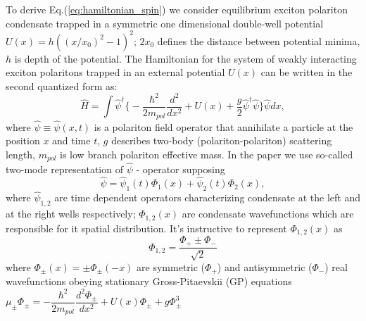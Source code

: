 \documentclass[aps, pre, preprint, groupedaddress, superscriptaddress, showkeys, showpacs] {revtex4-1}
\begin{document}
{To derive Eq.(\ref{eq:hamiltonian_spin}) we consider equilibrium exciton polariton condensate trapped in a symmetric one dimensional double-well potential $U(x) = h ((x/x_0)^2 - 1)^2$; $2x_0$ defines the distance between potential minima, $h$ is depth of the potential.
% 
%
The Hamiltonian for the system of weakly interacting exciton polaritons trapped in an external potential $U(x)$ can be written in the second quantized form as:
%
\begin{equation}
\hat{H} = \int \hat{\psi}^\dag\Big\{ -\dfrac{\hbar^2}{2m_{pol}}  \dfrac{d^2 }{dx^2} + U(x) + \dfrac{g}{2} \hat{\psi}^{\dag} \hat{\psi}  \Big\}\hat{\psi} dx,
\label{eq:gpe_hamiltonian}
\end{equation}
%
where $\hat{\psi} \equiv \hat{\psi}(x, t)$ is a polariton field operator that annihilate a particle at the position $x$ and time $t$, $g$ describes two-body (polariton-polariton) scattering length, $m_{pol}$ is low branch polariton effective mass.
In the paper we use so-called two-mode representation of $\hat{\psi}$ - operator supposing
%
\begin{equation}
\hat{\psi} = \hat{\psi}_1(t) \Phi_1(x) + \hat{\psi}_2(t) \Phi_2(x),
\label{eq:two_modes}
\end{equation}
%
where $\hat{\psi}_{1,2}$ are time dependent operators characterizing condensate at the left and at the right wells respectively; $\Phi_{1,2}(x)$ are condensate wavefunctions which are responsible for it spatial distribution.
It's instructive to represent  $\Phi_{1,2}(x)$ as
%
\begin{equation}
\Phi_{1,2} = \dfrac{\Phi_+ \pm \Phi_-}{\sqrt{2}}
\label{eq:basic_modes}
\end{equation}
%
where $\Phi_{\pm}(x) = \pm \Phi_{\pm}(-x)$ are symmetric ($\Phi_+$) and antisymmetric ($\Phi_-$) real wavefunctions obeying stationary Gross-Pitaevskii (GP) equations $\mu_{\pm} \Phi_{\pm} = -\dfrac{\hbar^2}{2m_{pol}} \dfrac{d^2 \Phi_{\pm}}{dx^2} + U(x) \Phi_{\pm} + g \Phi_{\pm}^3$
%
}
\end{document}
